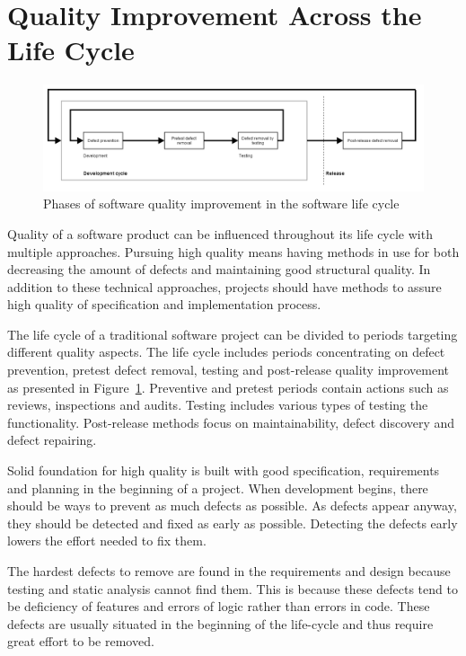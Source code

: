 \section{Quality Improvement Across the Life Cycle}

\begin{figure}[t]
\begin{center}
\includegraphics[width=1.0\textwidth]{image/quality_lifecycle.png}
\end{center}
\caption{Phases of software quality improvement in the software life cycle}
\label{fig:quality_life_cycle}
\end{figure}

Quality of a software product can be influenced throughout its life cycle with multiple approaches. Pursuing high quality means having methods in use for both decreasing the amount of defects and maintaining good structural quality. In addition to these technical approaches, projects should have methods to assure high quality of specification and implementation process.

The life cycle of a traditional software project can be divided to periods targeting different quality aspects. The life cycle includes periods concentrating on defect prevention, pretest defect removal, testing and post-release quality improvement as presented in Figure~\ref{fig:quality_life_cycle}. Preventive and pretest periods contain actions such as reviews, inspections and audits. Testing includes various types of testing the functionality. Post-release methods focus on maintainability, defect discovery and defect repairing.

Solid foundation for high quality is built with good specification, requirements and planning in the beginning of a project. When development begins, there should be ways to prevent as much defects as possible. As defects appear anyway, they should be detected and fixed as early as possible. Detecting the defects early lowers the effort needed to fix them. 

The hardest defects to remove are found in the requirements and design because testing and static analysis cannot find them. This is because these defects tend to be deficiency of features and errors of logic rather than errors in code. These defects are usually situated in the beginning of the life-cycle and thus require great effort to be removed. 

